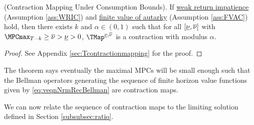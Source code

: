 \documentclass[\econtexRoot/BufferStockTheory]{subfiles}
\begin{document}
\begin{theorem}(Contraction Mapping Under Consumption Bounds).
\label{thm:cmap}\label{subsec:contraction}%
If \hyperlink{WRIC}{weak return impatience} (Assumption \ref{ass:WRIC})  and  \hyperlink{FVAC}{finite value of autarky} (Assumption \ref{ass:FVAC}) hold, then there exists $k$ and $\alpha\in (0,1)$ such that for all $[\underline{\nu}, \overline{\nu}]$ with $\MPCmax_{T-k}\geq \MPCmaxInf> \MPCminInf>0$, $\TMap^{\MPCminInf, \MPCmaxInf}$ is a contraction with modulus $\alpha$.
\end{theorem}
\begin{proof}
See Appendix \ref{sec:Tcontractionmapping} for the proof.

\end{proof}

The theorem says eventually the maximal MPCs will be small enough such that the Bellman operators generating the sequence of finite horizon value functions given by \eqref{eq:veqnNrmRecBellman} are contraction maps.

We can now relate the sequence of contraction maps to the limiting solution defined in Section \ref{subsubsec:ratio}.
\end{document}
